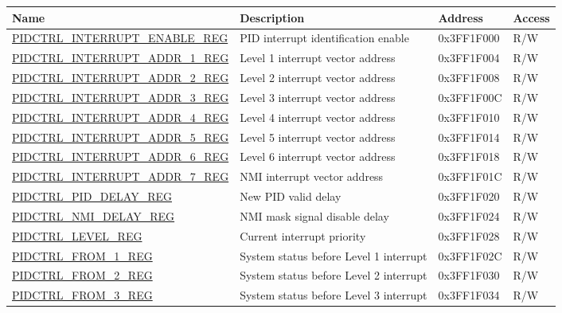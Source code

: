 \begin{longtable}{ | p{5.8cm} | p{6.2cm} | p{2cm} | p{1cm} | }
\hline\rowcolor{lightgray}
Name & Description &  Address & Access \\ \hline
\hyperref[regdesc:PIDCTRLINTERRUPTENABLEREG]{PIDCTRL\_INTERRUPT\_ENABLE\_REG} & PID interrupt identification enable & 0x3FF1F000 & R/W \\ \hline
\hyperref[regdesc:PIDCTRLINTERRUPTADDR1REG]{PIDCTRL\_INTERRUPT\_ADDR\_1\_REG} & Level 1 interrupt vector address& 0x3FF1F004 & R/W \\ \hline
\hyperref[regdesc:PIDCTRLINTERRUPTADDR2REG]{PIDCTRL\_INTERRUPT\_ADDR\_2\_REG} & Level 2 interrupt vector address & 0x3FF1F008 & R/W \\ \hline
\hyperref[regdesc:PIDCTRLINTERRUPTADDR3REG]{PIDCTRL\_INTERRUPT\_ADDR\_3\_REG} & Level 3 interrupt vector address & 0x3FF1F00C & R/W \\ \hline
\hyperref[regdesc:PIDCTRLINTERRUPTADDR4REG]{PIDCTRL\_INTERRUPT\_ADDR\_4\_REG} & Level 4 interrupt vector address  & 0x3FF1F010 & R/W \\ \hline
\hyperref[regdesc:PIDCTRLINTERRUPTADDR5REG]{PIDCTRL\_INTERRUPT\_ADDR\_5\_REG} & Level 5 interrupt vector address & 0x3FF1F014 & R/W \\ \hline
\hyperref[regdesc:PIDCTRLINTERRUPTADDR6REG]{PIDCTRL\_INTERRUPT\_ADDR\_6\_REG} & Level 6 interrupt vector address  & 0x3FF1F018 & R/W \\ \hline
\hyperref[regdesc:PIDCTRLINTERRUPTADDR7REG]{PIDCTRL\_INTERRUPT\_ADDR\_7\_REG} & NMI interrupt vector address & 0x3FF1F01C & R/W \\ \hline
\hyperref[regdesc:PIDCTRLPIDDELAYREG]{PIDCTRL\_PID\_DELAY\_REG} & New PID valid delay & 0x3FF1F020 & R/W \\ \hline
\hyperref[regdesc:PIDCTRLNMIDELAYREG]{PIDCTRL\_NMI\_DELAY\_REG} & NMI mask signal disable delay & 0x3FF1F024 & R/W \\ \hline
\hyperref[regdesc:PIDCTRLLEVELREG]{PIDCTRL\_LEVEL\_REG} & Current interrupt priority & 0x3FF1F028 & R/W \\ \hline
\hyperref[regdesc:PIDCTRLFROMnREG]{PIDCTRL\_FROM\_1\_REG} & System status before Level 1 interrupt & 0x3FF1F02C & R/W \\ \hline
\hyperref[regdesc:PIDCTRLFROMnREG]{PIDCTRL\_FROM\_2\_REG} & System status before Level 2 interrupt & 0x3FF1F030 & R/W \\ \hline
\hyperref[regdesc:PIDCTRLFROMnREG]{PIDCTRL\_FROM\_3\_REG} & System status before Level 3 interrupt & 0x3FF1F034 & R/W \\ \hline

\end{longtable}
